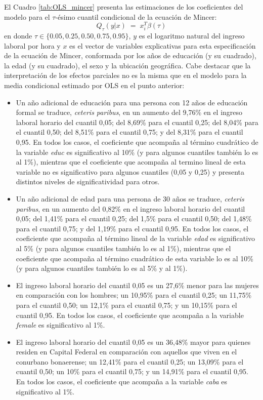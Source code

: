 \documentclass[11pt]{article}
\begin{document}
El Cuadro \ref{tab:OLS_mincer} presenta las estimaciones de los coeficientes del modelo para el $\tau$-ésimo cuantil condicional de la ecuación de Mincer:
\[
Q_{\tau}(y|x)\;=\;x_{i}^{T}\beta(\tau)
\]
en donde $\tau\in\{0.05,0.25,0.50,0.75,0.95\}$, $y$ es el logaritmo natural del ingreso laboral por hora y $x$ es el vector de variables explicativas para esta especificación de la ecuación de Mincer, conformada por los años de educación (y su cuadrado), la edad (y su cuadrado), el sexo y la ubicación geográfica. Cabe destacar que la interpretación de los efectos parciales no es la misma que en el modelo para la media condicional estimado por OLS en el punto anterior:
    \begin{itemize}
        \item Un año adicional de educación para una persona con 12 años de educación formal se traduce, \emph{ceteris paribus}, en un aumento del 9,76\% en el ingreso laboral horario del cuantil 0,05; del 8,69\% para el cuantil 0,25; del 8,04\% para el cuantil 0,50; del 8,51\% para el cuantil 0,75; y del 8,31\% para el cuantil 0,95. En todos los casos, el coeficiente que acompaña al término cuadrático de la variable \emph{educ} es significativo al 10\% (y para algunos cuantiles también lo es al 1\%), mientras que el coeficiente que acompaña al termino lineal de esta variable no es significativo para algunos cuantiles (0,05 y 0,25) y presenta distintos niveles de significatividad para otros.
        \item Un año adicional de edad para una persona de 30 años se traduce, \emph{ceteris paribus}, en un aumento del 0,82\% en el ingreso laboral horario del cuantil 0,05; del 1,41\% para el cuantil 0,25; del 1,5\% para el cuantil 0,50; del 1,48\% para el cuantil 0,75; y del 1,19\% para el cuantil 0,95. En todos los casos, el coeficiente que acompaña al término lineal de la variable \emph{edad} es significativo al 5\% (y para algunos cuantiles también lo es al 1\%), mientras que el coeficiente que acompaña al término cuadrático de esta variable lo es al 10\% (y para algunos cuantiles también lo es al 5\% y al 1\%). 
        \item El ingreso laboral horario del cuantil 0,05 es un 27,6\% menor para las mujeres en comparación con los hombres; un 10,95\% para el cuantil 0,25; un 11,75\% para el cuantil 0,50; un 12,1\% para el cuantil 0,75; y un 10,15\% para el cuantil 0,95. En todos los casos, el coeficiente que acompaña a la variable \emph{female} es significativo al 1\%.
        \item El ingreso laboral horario del cuantil 0,05 es un 36,48\% mayor para quienes residen en Capital Federal en comparación con aquellos que viven en el conurbano bonaerense; un 12,41\% para el cuantil 0,25; un 13,09\% para el cuantil 0,50; un 10\% para el cuantil 0,75; y un 14,91\% para el cuantil 0,95. En todos los casos, el coeficiente que acompaña a la variable \emph{caba} es significativo al 1\%.
    \end{itemize}
\end{document}
